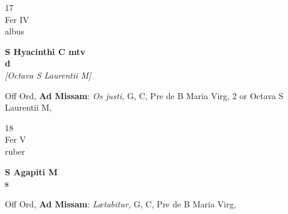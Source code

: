 \documentclass[10pt, openany]{book}
\begin{document}
        \begin{center}
            \begin{minipage}{3.5in}
                \vspace{2em}
                \begin{minipage}{0.5in}
                    {\Huge 17} \\
                    {\normalsize Fer IV} \\
                    {\normalsize albus}
                \end{minipage}
                \begin{minipage}{3.0in}
                    \textbf{ \large S Hyacinthi C mtv \\
                    \textnormal{\normalsize d}} \\ \textit{[Octava S Laurentii M]} \\ 
                \end{minipage}
                \begin{justify}Off Ord, \textbf{Ad Missam}: \textit{Os justi,} G, C, Pre de B Maria Virg, 2 or Octava S Laurentii M,  
                \end{justify}
            \end{minipage}
        \end{center}
    
        \begin{center}
            \begin{minipage}{3.5in}
                \vspace{2em}
                \begin{minipage}{0.5in}
                    {\Huge 18} \\
                    {\normalsize Fer V} \\
                    {\normalsize ruber}
                \end{minipage}
                \begin{minipage}{3.0in}
                    \textbf{ \large S Agapiti M \\
                    \textnormal{\normalsize s}} \\ 
                \end{minipage}
                \begin{justify}Off Ord, \textbf{Ad Missam}: \textit{Lætabitur,} G, C, Pre de B Maria Virg,  
                \end{justify}
            \end{minipage}
        \end{center}
    
\end{document}
